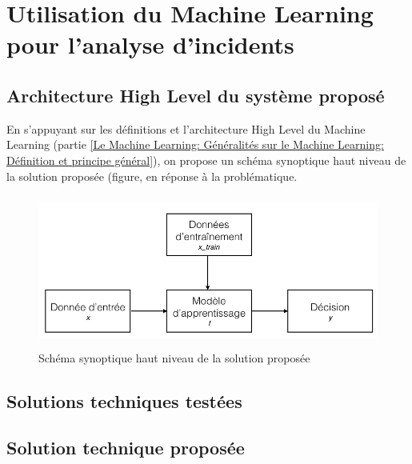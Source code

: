 \chapter{Utilisation du Machine Learning pour l'analyse d'incidents}
\label{Utilisation du Machine Learning pour l'analyse d'incidents}
\thispagestyle{fancy}


\section{Architecture High Level du système proposé}
\label{Utilisation du Machine Learning pour l'analyse d'incidents: Achitecture High Level du système proposé}
En s'appuyant sur les définitions et l'architecture High Level du Machine Learning (partie \ref{Le Machine Learning: Généralités sur le Machine Learning: Définition et principe général}), on propose un schéma synoptique haut niveau de la solution proposée (figure, en réponse à la problématique. 

\begin{figure}[h]
	\centering\includegraphics[height=5cm]{images/ML_high_level.jpeg}
	\caption{Schéma synoptique haut niveau de la solution proposée}
	\label{fig:Schéma synoptique haut niveau de la solution proposée}
\end{figure}

\section{Solutions techniques testées}
\label{Utilisation du Machine Learning pour l'analyse d'incidents: Solutions techniques testées}




\section{Solution technique proposée}
\label{Utilisation du Machine Learning pour l'analyse d'incidents: Solution technique proposée}

